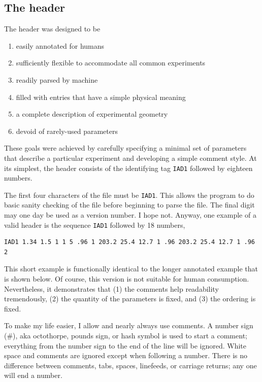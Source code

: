 \documentclass{article}
\begin{document}
\subsection{The header}
The header was designed to be
\begin{enumerate}
\setlength{\itemsep}{0pt}
\item easily annotated for humans
\item sufficiently flexible to accommodate all common experiments
\item readily parsed by machine
\item filled with entries that have a simple physical meaning
\item a complete description of experimental geometry
\item devoid of rarely-used parameters
\end{enumerate}
These goals were achieved by carefully specifying a minimal set of
parameters that describe a particular experiment and developing a
simple comment style.  At its simplest, the header consists of the
identifying tag \texttt{IAD1} followed by eighteen numbers.

The first four characters of the file must be \texttt{IAD1}.  
This allows the program to do basic sanity checking of the file before 
beginning to parse the file.  The final digit may one day be used as
a version number.  I hope not.  Anyway, one example of a valid
header is the sequence
\texttt{IAD1} followed by 18 numbers,
\begin{center}
\begin{minipage}{8cm}
\scriptsize
\begin{verbatim}
IAD1 1.34 1.5 1 1 5 .96 1 203.2 25.4 12.7 1 .96 203.2 25.4 12.7 1 .96 2 
\end{verbatim}
\end{minipage}
\end{center}
This short example is functionally identical to the longer annotated example
that is shown below.  Of course, this version is not suitable for human consumption.  
Nevertheless, it demonstrates that (1) the comments help readability tremendously, (2) the quantity of the parameters is fixed, and (3) the ordering is fixed.

To make my life easier, I allow and nearly always use comments.
A number sign (\#), aka octothorpe, pounds sign, or hash symbol is used to start a comment; everything
from the number sign to the end of the line will be ignored.
White space and comments are ignored except when following a number.  There
is no difference between comments, tabs, spaces, linefeeds, or carriage returns; any
one will end a number. 
\end{document}

